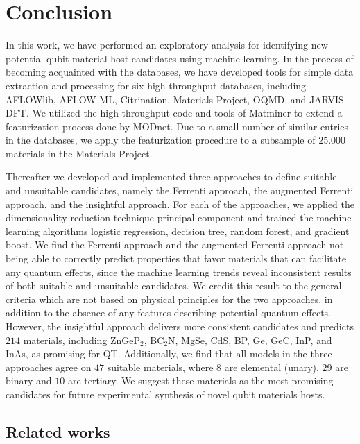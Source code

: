 \chapter*{Conclusion}

In this work, we have performed an exploratory analysis for identifying new potential qubit material host candidates using machine learning. In the process of becoming acquainted with the databases, we have developed tools for simple data extraction and processing for six high-throughput databases, including AFLOWlib, AFLOW-ML, Citrination, Materials Project, OQMD, and JARVIS-DFT. We utilized the high-throughput code and tools of Matminer to extend a featurization process done by MODnet. Due to a small number of similar entries in the databases, we apply the featurization procedure to a subsample of $25.000$ materials in the Materials Project.

Thereafter we developed and implemented three approaches to define suitable and unsuitable candidates, namely the Ferrenti approach, the augmented Ferrenti approach, and the insightful approach. For each of the approaches, we applied the dimensionality reduction technique principal component and trained the machine learning algorithms logistic regression, decision tree, random forest, and gradient boost. We find the Ferrenti approach and the augmented Ferrenti approach not being able to correctly predict properties that favor materials that can facilitate any quantum effects, since the machine learning trends reveal inconsistent results of both suitable and unsuitable candidates. We credit this result to the general criteria which are not based on physical principles for the two approaches, in addition to the absence of any features describing potential quantum effects. However, the insightful approach delivers more consistent candidates and predicts $214$ materials, including ZnGeP$_2$, BC$_2$N, MgSe, CdS, BP, Ge, GeC, InP, and InAs, as promising for QT. Additionally, we find that all models in the three approaches agree on $47$ suitable materials, where $8$ are elemental (unary), $29$ are binary and $10$ are tertiary. We suggest these materials as the most promising candidates for future experimental synthesis of novel qubit materials hosts. %
\clearpage

\section*{Related works}

